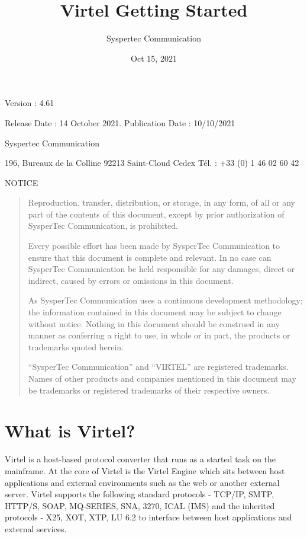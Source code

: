 \documentclass[letterpaper,10pt,english]{sphinxmanual}
\title{Virtel Getting Started}
\date{Oct 15, 2021}
\author{Syspertec Communication}
\begin{document}
\pagestyle{empty}
\sphinxmaketitle
\pagestyle{plain}
\sphinxtableofcontents
\pagestyle{normal}
\label{\detokenize{Getting_Started::doc}}



Version : 4.61

Release Date : 14 October 2021. Publication Date : 10/10/2021

Syspertec Communication

196, Bureaux de la Colline 92213 Saint-Cloud Cedex Tél. : +33 (0) 1 46 02 60 42


NOTICE
\begin{quote}

Reproduction, transfer, distribution, or storage, in any form, of all or any part of
the contents of this document, except by prior authorization of SysperTec
Communication, is prohibited.

Every possible effort has been made by SysperTec Communication to ensure that this document
is complete and relevant. In no case can SysperTec Communication be held responsible for
any damages, direct or indirect, caused by errors or omissions in this document.

As SysperTec Communication uses a continuous development methodology; the information
contained in this document may be subject to change without notice. Nothing in this
document should be construed in any manner as conferring a right to use, in whole or in
part, the products or trademarks quoted herein.

“SysperTec Communication” and “VIRTEL” are registered trademarks. Names of other products
and companies mentioned in this document may be trademarks or registered trademarks of
their respective owners.
\end{quote}


\chapter{What is Virtel?}
\label{\detokenize{Getting_Started:what-is-virtel}}
Virtel is a host-based protocol converter that runs as a started task on the mainframe. At the core of Virtel is the Virtel Engine which sits between host applications and external environments such as the web or another external server. Virtel supports the following standard protocols - TCP/IP, SMTP, HTTP/S, SOAP, MQ-SERIES, SNA, 3270, ICAL (IMS) and the inherited protocols - X25, XOT, XTP, LU 6.2 to interface between host applications and external services.
\end{document}
